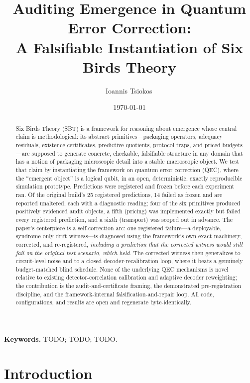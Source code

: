 \documentclass[11pt]{article}
\title{Auditing Emergence in Quantum Error Correction:\\
A Falsifiable Instantiation of Six Birds Theory}
\author{Ioannis Tsiokos\,\orcidlink{0009-0009-7659-5964}}
\date{\today}
\theoremstyle{definition}
\begin{document}
\maketitle
\thispagestyle{firstpage}

\begin{abstract}
Six Birds Theory (SBT) is a framework for reasoning about emergence whose central claim is methodological: its abstract primitives---packaging operators, adequacy residuals, existence certificates, predictive quotients, protocol traps, and priced budgets---are supposed to generate concrete, checkable, falsifiable structure in any domain that has a notion of packaging microscopic detail into a stable macroscopic object. We test that claim by instantiating the framework on quantum error correction (QEC), where the ``emergent object'' is a logical qubit, in an open, deterministic, exactly reproducible simulation prototype. Predictions were registered and frozen before each experiment ran. Of the original build's 25 registered predictions, 14 failed as frozen and are reported unaltered, each with a diagnostic reading; four of the six primitives produced positively evidenced audit objects, a fifth (pricing) was implemented exactly but failed every registered prediction, and a sixth (transport) was scoped out in advance. The paper's centerpiece is a self-correction arc: one registered failure---a deployable, syndrome-only drift witness---is diagnosed using the framework's own exact machinery, corrected, and re-registered, \emph{including a prediction that the corrected witness would still fail on the original test scenario, which held}. The corrected witness then generalizes to circuit-level noise and to a closed decoder-recalibration loop, where it beats a genuinely budget-matched blind schedule. None of the underlying QEC mechanisms is novel relative to existing detector-correlation calibration and adaptive decoder reweighting; the contribution is the audit-and-certificate framing, the demonstrated pre-registration discipline, and the framework-internal falsification-and-repair loop. All code, configurations, and results are open and regenerate byte-identically. \end{abstract}

\medskip
\noindent\textbf{Keywords.} TODO; TODO; TODO.

\section{Introduction}
\label{sec:intro}
\end{document}
